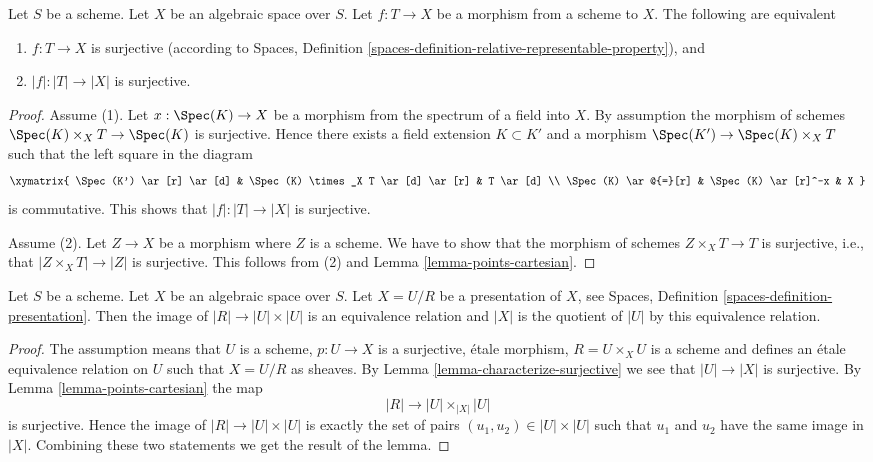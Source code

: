 \begin{lemma}
\label{lemma-characterize-surjective}
Let $S$ be a scheme.
Let $X$ be an algebraic space over $S$.
Let $f : T \to X$ be a morphism from a scheme to $X$.
The following are equivalent
\begin{enumerate}
\item $f : T \to X$ is surjective (according to
Spaces, Definition \ref{spaces-definition-relative-representable-property}),
and
\item $|f| : |T| \to |X|$ is surjective.
\end{enumerate}
\end{lemma}

\begin{proof}
Assume (1). Let $x : \Spec(K) \to X$ be a morphism
from the spectrum of a field into $X$. By assumption the morphism of
schemes $\Spec(K) \times_X T \to \Spec(K)$ is surjective.
Hence there exists a field extension $K \subset K'$ and a morphism
$\Spec(K') \to \Spec(K) \times_X T$ such that the left
square in the diagram
$$
\xymatrix{
\Spec(K') \ar[r] \ar[d] &
\Spec(K) \times_X T \ar[d] \ar[r] &
T \ar[d] \\
\Spec(K) \ar@{=}[r] &
\Spec(K) \ar[r]^-x & X
}
$$
is commutative. This shows that $|f| : |T| \to |X|$ is surjective.

\medskip\noindent
Assume (2). Let $Z \to X$ be a morphism where $Z$ is
a scheme. We have to show that the morphism of schemes $Z \times_X T \to T$
is surjective, i.e., that $|Z \times_X T| \to |Z|$ is surjective.
This follows from (2) and
Lemma \ref{lemma-points-cartesian}.
\end{proof}

\begin{lemma}
\label{lemma-points-presentation}
Let $S$ be a scheme.
Let $X$ be an algebraic space over $S$.
Let $X = U/R$ be a presentation of $X$, see
Spaces, Definition \ref{spaces-definition-presentation}.
Then the image of $|R| \to |U| \times |U|$ is an equivalence relation
and $|X|$ is the quotient of $|U|$ by this equivalence relation.
\end{lemma}

\begin{proof}
The assumption means that $U$ is a scheme, $p : U \to X$ is a surjective,
\'etale morphism, $R = U \times_X U$ is a scheme and defines an \'etale
equivalence relation on $U$ such that $X = U/R$ as sheaves. By
Lemma \ref{lemma-characterize-surjective}
we see that $|U| \to |X|$ is surjective. By
Lemma \ref{lemma-points-cartesian}
the map
$$
|R| \longrightarrow |U| \times_{|X|} |U|
$$
is surjective. Hence the image of $|R| \to |U| \times |U|$ is
exactly the set of pairs $(u_1, u_2) \in |U| \times |U|$
such that $u_1$ and $u_2$ have the same image in $|X|$.
Combining these two statements we get the result of the lemma.
\end{proof}

